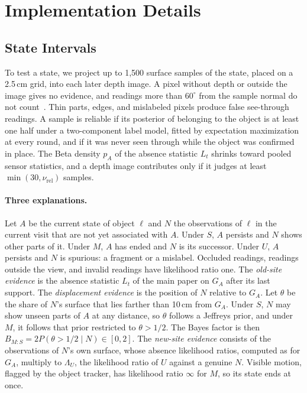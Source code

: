 \section{Implementation Details}
\label{sec:supp_impl}

\subsection{State Intervals}
\label{sec:supp_states}

To test a state, we project up to 1{,}500 surface samples of the state, placed on a 2.5\,cm grid, into each
later depth image. A pixel without depth or outside the image gives no evidence, and readings more than $60^\circ$ from
the sample normal do not count~\cite{nguyen2012kinect}. Thin parts, edges, and mislabeled pixels produce false
see-through readings. A sample is reliable if its posterior of belonging to the object is at least one half under a
two-component label model, fitted by expectation maximization at every round, and if it was never seen through while
the object was confirmed in place. The Beta density $p_A$ of the absence statistic $L_t$ shrinks toward pooled
sensor statistics, and a depth image contributes only if it judges at least $\min(30, \nu_{\mathrm{rel}})$ samples.

\paragraph{Three explanations.}
Let $A$ be the current state of object $\ell$ and $N$ the observations of $\ell$ in the current visit that are not yet
associated with $A$. Under $S$, $A$ persists and $N$ shows other parts of it. Under $M$, $A$ has ended and $N$ is its
successor. Under $U$, $A$ persists and $N$ is spurious: a fragment or a mislabel. Occluded readings, readings outside
the view, and invalid readings have likelihood ratio one. The \emph{old-site evidence} is the absence statistic $L_t$
of the main paper on $G_A$ after its last support. The \emph{displacement evidence} is the position of $N$ relative to
$G_A$. Let $\theta$ be the share of $N$'s surface that lies farther than 10\,cm from $G_A$. Under $S$, $N$ may show
unseen parts of $A$ at any distance, so $\theta$ follows a Jeffreys prior, and under $M$, it follows that prior
restricted to $\theta > 1/2$. The Bayes factor is then $B_{M:S} = 2P(\theta > 1/2 \mid N) \in [0, 2]$. The
\emph{new-site evidence} consists of the observations of $N$'s own surface, whose absence likelihood ratios, computed as
for $G_A$, multiply to $\Lambda_U$, the likelihood ratio of $U$ against a genuine $N$. Visible motion, flagged by the
object tracker, has likelihood ratio $\infty$ for $M$, so its state ends at once.

